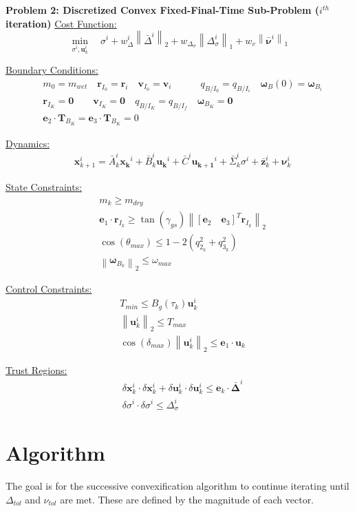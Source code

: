 \clearpage
\begin{mdframed}
\textbf{Problem 2: Discretized Convex Fixed-Final-Time Sub-Problem ($i^{th}$ iteration)}
\underline{Cost Function:}
\begin{equation*}
\min_{\sigma^i, \mathbf{u}_k^i} \quad \sigma^i + w_\Delta^i \left\lVert \bar{\Delta}^i \right\lVert_2 + w_{\Delta_\sigma}\left\lVert\Delta_\sigma^i\right\lVert_1 + w_v \left\lVert\bar{\bm{\nu}}^i\right\lVert_1
\end{equation*}

\underline{Boundary Conditions:}  
\begin{align*}
& m_0 = m_{wet} \quad \mathbf{r}_{I_0} = \mathbf{r}_i \quad \mathbf{v}_{I_0} = \mathbf{v}_i \quad \quad \quad{q}_{B/I_0} = {q}_{B/I _{i}} \quad \bm{\omega}_B(0) = \bm{\omega}_{B _{i}} \\
& \mathbf{r}_{I_K} = \mathbf{0} \quad \quad \mathbf{v}_{I_K} = \mathbf{0} \quad {q}_{B/I _K} = {q}_{B/I _ {f}} \quad \bm{\omega}_{B_K} = \mathbf{0} \\
& \mathbf{e}_2 \cdot \mathbf{T}_{B_K}= \mathbf{e}_3 \cdot \mathbf{T}_{B_K}= 0
\end{align*}

\underline{Dynamics:}  
\begin{align*}
& \mathbf{x}_{k+1}^i = \bar{A}_k^i\mathbf{x_k}^i + \bar{B}_k^i\mathbf{u_k}^i + \bar{C}^i\mathbf{u_{k+1}}^i + \bar{\Sigma}_k^i\sigma^i + \bar{\mathbf{z}}^i_k + \bm{\nu}_k^i
\end{align*}

\underline{State Constraints:}  
\begin{align*}
& m_k \geq m_{dry} \\
& \mathbf{e}_1 \cdot \mathbf{r}_{I_k} \geq \tan(\gamma_{gs}) \left\lVert \left[\mathbf{e}_2 \quad \mathbf{e}_3\right]^T \mathbf{r}_{I_k} \right\lVert_2 \\
& \cos(\theta_{max}) \leq 1-2(q_{2_k}^{2}+q_{3_k}^{2}) \\
& \left \lVert \bm{\omega}_{B_k} \right \lVert_2 \leq \omega_{max}
\end{align*}

\underline{Control Constraints:}  
\begin{align*}
& T_{min} \leq B_g(\tau_k)\mathbf{u}_k^i \\
& \left \lVert \mathbf{u}_k^i \right \lVert_2 \leq T_{max} \\
& \cos(\delta_{max}) \left \lVert \mathbf{u}_k^i \right \lVert_2 \leq \bm{e}_1 \cdot \mathbf{u}_k
\end{align*}

\underline{Trust Regions:}  
\begin{align*}
& \delta \mathbf{x}_k^i \cdot \delta \mathbf{x}_k^i + \delta \mathbf{u}_k^i \cdot \delta \mathbf{u}_k^i \leq \mathbf{e}_k \cdot \bm{\bar{\Delta}}^i \\
& \delta \sigma^i \cdot \delta \sigma^i \leq \Delta_\sigma^i
\end{align*}

\end{mdframed}



\clearpage
\section{Algorithm}
The goal is for the successive convexification algorithm to continue iterating until $\Delta_{tol}$ and $\nu_{tol}$ are met. These are defined by the magnitude of each vector.
